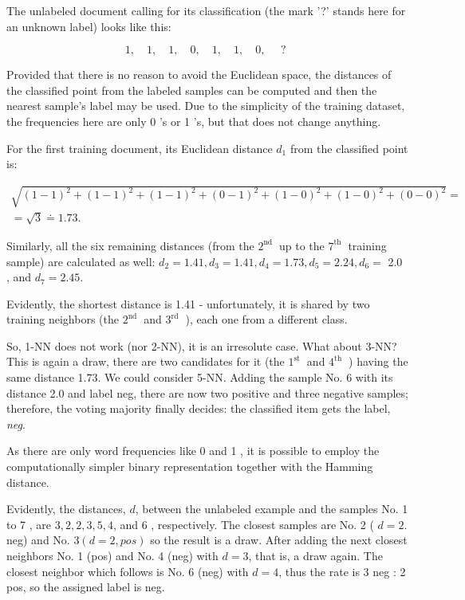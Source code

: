 The unlabeled document calling for its classification (the mark '?' stands here for an unknown label) looks like this:

$$
1, \quad 1, \quad 1, \quad 0, \quad 1, \quad 1, \quad 0, \quad \text { ? }
$$

Provided that there is no reason to avoid the Euclidean space, the distances of the classified point from the labeled samples can be computed and then the nearest sample's label may be used. Due to the simplicity of the training dataset, the frequencies here are only 0 's or 1 's, but that does not change anything.

For the first training document, its Euclidean distance $d_{1}$ from the classified point is:

$$
\begin{gathered}
\sqrt{(1-1)^{2}+(1-1)^{2}+(1-1)^{2}+(0-1)^{2}+(1-0)^{2}+(1-0)^{2}+(0-0)^{2}}= \\
=\sqrt{3} \doteq 1.73 .
\end{gathered}
$$

Similarly, all the six remaining distances (from the $2^{\text {nd }}$ up to the $7^{\text {th }}$ training sample) are calculated as well: $d_{2}=1.41, d_{3}=1.41, d_{4}=1.73, d_{5}=2.24, d_{6}=$ 2.0 , and $d_{7}=2.45$.

Evidently, the shortest distance is 1.41 - unfortunately, it is shared by two training neighbors (the $2^{\text {nd }}$ and $3^{\text {rd }}$ ), each one from a different class.

So, 1-NN does not work (nor 2-NN), it is an irresolute case. What about 3-NN? This is again a draw, there are two candidates for it (the $1^{\text {st }}$ and $4^{\text {th }}$ ) having the same distance 1.73. We could consider 5-NN. Adding the sample No. 6 with its distance 2.0 and label neg, there are now two positive and three negative samples; therefore, the voting majority finally decides: the classified item gets the label, \textit{neg}.

As there are only word frequencies like 0 and 1 , it is possible to employ the computationally simpler binary representation together with the Hamming distance.

Evidently, the distances, $d$, between the unlabeled example and the samples No. 1 to 7 , are $3,2,2,3,5,4$, and 6 , respectively. The closest samples are No. 2 ( $d=2$. neg) and No. $3(d=2, p o s)$ so the result is a draw. After adding the next closest neighbors No. 1 (pos) and No. 4 (neg) with $d=3$, that is, a draw again. The closest neighbor which follows is No. 6 (neg) with $d=4$, thus the rate is 3 neg : 2 pos, so the assigned label is neg.

